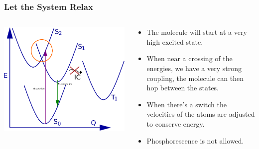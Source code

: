\documentclass{beamer}
\begin{document}
\begin{frame}
  \frametitle{Let the System Relax}
\begin{columns}[c]
  \includegraphics[width=\textwidth]{Images/abs_chart_modified}
  \begin{block}{}
    \begin{itemize}
    \item The molecule will start at a very high excited state.
    \item When near a crossing of the energies, we have a very strong coupling,
      the molecule can then hop between the states.
    \item When there's a switch the velocities of the atoms are adjusted to conserve energy.
    \item Phosphorescence is not allowed.
    \end{itemize}
  \end{block}
\end{columns}
\end{frame}
\end{document}
